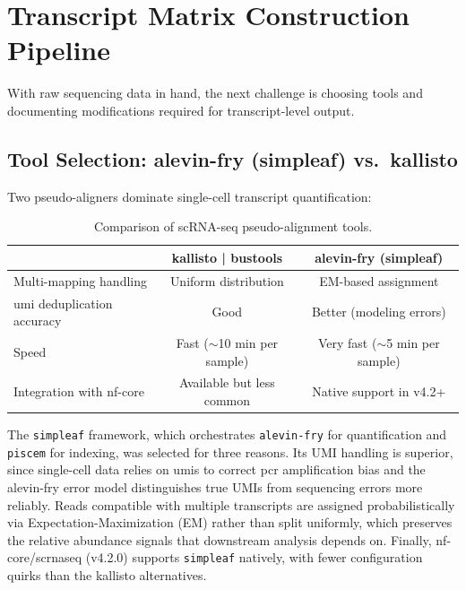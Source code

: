 \section{Transcript Matrix Construction Pipeline}\label{sec:pipeline}

With raw sequencing data in hand, the next challenge is choosing tools and documenting modifications required for transcript-level output.

\subsection*{Tool Selection: alevin-fry (simpleaf) vs.\ kallisto}

Two pseudo-aligners dominate single-cell transcript quantification:

\begin{table}[htbp]
    \centering
    \caption{Comparison of scRNA-seq pseudo-alignment tools.}\label{tab:pseudoalign-tools}
    \vspace{0.5em}
    \small
    \setlength{\tabcolsep}{3pt}
    \begin{tabular}{lcc}
        \toprule
        & \textbf{kallisto | bustools} & \textbf{alevin-fry (simpleaf)} \\
        \midrule
        Multi-mapping handling & Uniform distribution & EM-based assignment \\
        \gls{umi} deduplication accuracy & Good & Better (modeling errors) \\
        Speed & Fast ($\sim$10 min per sample) & Very fast ($\sim$5 min per sample) \\
        Integration with nf-core & Available but less common & Native support in v4.2+ \\
        \bottomrule
    \end{tabular}
\end{table}

The \texttt{simpleaf} framework\cite{he2023simpleaf}, which orchestrates \texttt{alevin-fry} for quantification and \texttt{piscem} for indexing, was selected for three reasons. Its UMI handling is superior, since single-cell data relies on \glspl{umi} to correct \gls{pcr} amplification bias and the alevin-fry error model distinguishes true UMIs from sequencing errors more reliably. Reads compatible with multiple transcripts are assigned probabilistically via Expectation-Maximization (EM)\cite{dempster1977maximum} rather than split uniformly, which preserves the relative abundance signals that downstream analysis depends on. Finally, nf-core/scrnaseq (v4.2.0) supports \texttt{simpleaf} natively, with fewer configuration quirks than the kallisto alternatives.

